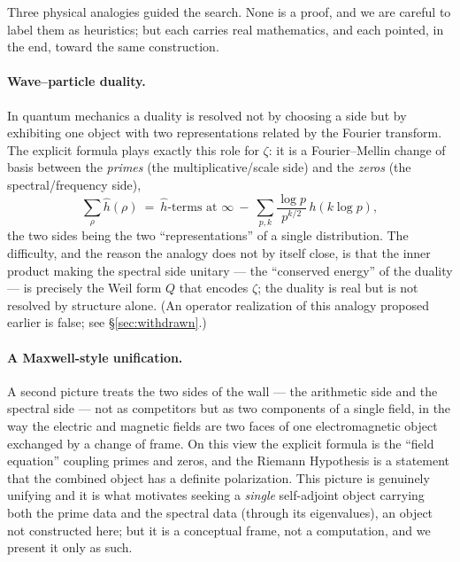 \documentclass[11pt]{amsart}
\theoremstyle{definition}
\theoremstyle{remark}
\theoremstyle{definition}
\begin{document}
Three physical analogies guided the search. None is a proof, and we are careful to label them as
heuristics; but each carries real mathematics, and each pointed, in the end, toward the same construction.

\paragraph{Wave--particle duality.} In quantum mechanics a duality is resolved not by choosing a side but
by exhibiting one object with two representations related by the Fourier transform. The explicit formula
plays exactly this role for $\zeta$: it is a Fourier--Mellin change of basis between the \emph{primes}
(the multiplicative/scale side) and the \emph{zeros} (the spectral/frequency side),
\[
   \sum_\rho \widehat h(\rho)\ =\ \widehat h\text{-terms at }\infty\ -\ \sum_{p,k}\frac{\log p}{p^{k/2}}\,
   h(k\log p),
\]
the two sides being the two ``representations'' of a single distribution. The difficulty, and the reason
the analogy does not by itself close, is that the inner product making the spectral side unitary --- the
``conserved energy'' of the duality --- is precisely the Weil form $Q$ that encodes $\zeta$; the duality is
real but is not resolved by structure alone. (An operator realization of this analogy proposed earlier is
false; see \S\ref{sec:withdrawn}.)

\paragraph{A Maxwell-style unification.} A second picture treats the two sides of the wall --- the
arithmetic side and the spectral side --- not as competitors but as two components of a single field, in
the way the electric and magnetic fields are two faces of one electromagnetic object exchanged by a change
of frame. On this view the explicit formula is the ``field equation'' coupling primes and zeros, and the
Riemann Hypothesis is a statement that the combined object has a definite polarization. This picture is
genuinely unifying and it is what motivates seeking a \emph{single} self-adjoint object carrying both the
prime data and the spectral data (through its eigenvalues), an object not constructed here; but it is a conceptual frame, not a computation, and we present it only as such.
\end{document}
